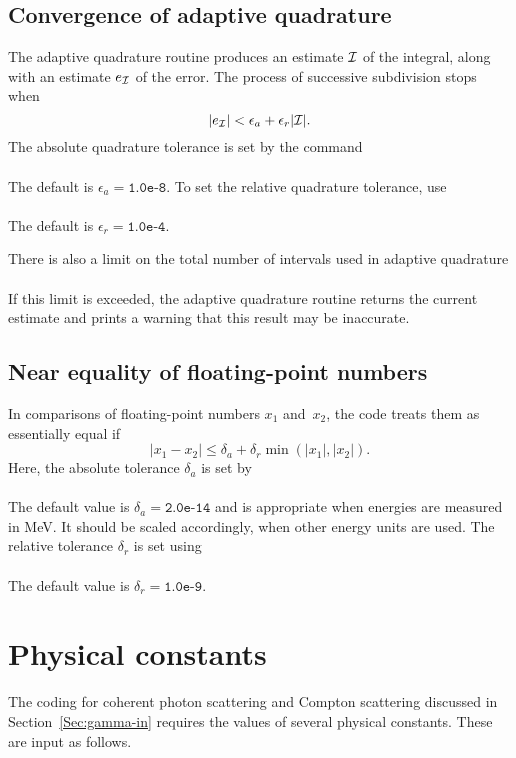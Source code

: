 \subsection{Convergence of adaptive quadrature}
The adaptive quadrature routine produces an estimate ${\cal I}$ of
the integral, along with an estimate $e_{\cal I}$ of the error.  The process of
successive subdivision stops when
$$
  | e_{\cal I} | < \epsilon_a + \epsilon_r | {\cal I} |.
$$
The absolute quadrature tolerance is set by the command\\
  \\
The default is $\epsilon_a = \texttt{1.0e-8}$.  To set the relative
quadrature tolerance, use\\
  \\
The default is $\epsilon_r = \texttt{1.0e-4}$. 

There is also a limit on the total number of intervals used in
adaptive quadrature\\
  \\
If this limit is exceeded, the adaptive quadrature routine returns
the current estimate and prints a warning that this result may be
inaccurate.

\subsection{Near equality of floating-point numbers}
In comparisons of floating-point numbers $x_1$ and~$x_2$, the code treats 
them as essentially equal if
$$
  | x_1 - x_2 | \le \delta_a + \delta_r \min( | x_1 |, | x_2 | ).
$$
Here, the absolute tolerance $\delta_a$ is set by\\
  \\
The default value is $\delta_a = \texttt{2.0e-14}$ and is appropriate
when energies are measured in MeV.  It should be scaled accordingly,
when other energy units are used.  The relative tolerance
$\delta_r$ is set using\\
  \\
The default value is $\delta_r = \texttt{1.0e-9}$.

\section{Physical constants}
The coding for coherent photon scattering and Compton scattering
discussed in Section~\ref{Sec:gamma-in} requires the values of several physical
constants.  These are input as follows.

